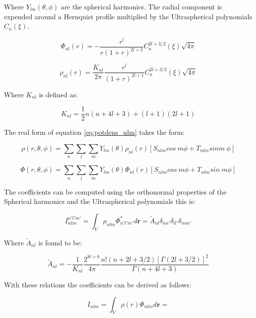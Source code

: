 \documentclass[14pt]{article}
\begin{document}
Where $Y_{lm}(\theta,\phi)$ are the spherical harmonics. The radial component
is expended around a Hernquist profile multiplied by the Ultraspherical
polynomials $C_{n}(\xi)$.


\begin{equation}
  \Phi_{nl}(r) = - \dfrac{r^l}{r(1+r)^{2l+3}}C_{n}^{2l+3/2}(\xi)\sqrt{4\pi}
\end{equation}

\begin{equation}
  \rho_{nl}(r) = \dfrac{K_{nl}}{2\pi}\dfrac{r^l}{(1+r)^{2l+1}}C_{n}^{2l+3/2}(\xi)\sqrt{4\pi}
\end{equation}


Where $K_{nl}$ is defined as:

\begin{equation}
    K_{nl}=\dfrac{1}{2}n(n+4l+3) +(l+1)(2l+1)
\end{equation}

The real form of equation \ref{eq:potdens_nlm} takes the form: 

\begin{equation}
  \rho(r, \theta, \phi) = \sum_{n} \sum_l \sum_m Y_{lm}(\theta) \rho_{nl}(r)
  \left[ S_{nlm} cos\ m \phi + T_{nlm} sin m\ \phi \right]
\end{equation}


\begin{equation}
  \Phi(r, \theta, \phi) = \sum_{n} \sum_l \sum_m Y_{lm}(\theta) \Phi_{nl}(r)
  \left[ S_{nlm} cos\ m\phi + T_{nlm} sin\ m \phi \right]
\end{equation}


The coefficients can be computed using the orthonormal properties of the
Spherical harmonics and the Ultraspherical polynomials this is:

\begin{equation}\label{eq:energy}
  I_{nlm}^{n'l'm'} = \int_V \rho_{nlm} \Phi_{n'l'm'}^*  d\textbf{r} = \tilde{A}_{nl} \delta_{nn'}
  \delta_{ll'} \delta_{mm'} 
\end{equation}

Where $\tilde{A}_{nl}$ is found to be:

\begin{equation}
    \tilde{A}_{nl} = - \frac{1}{K_{nl}}\frac{2^{8l+6}}{4\pi}\frac{n!(n+2l+3/2)[\Gamma(2l+3/2)]^2}{\Gamma(n+4l+3)}
\end{equation}

With these relations the coefficients can be derived as follows:

\begin{equation}\label{eq:coefficients}
  I_{nlm} = \int_V \rho(r) \Phi_{nlm} d\textbf{r} = 
\end{equation}
\end{document}
